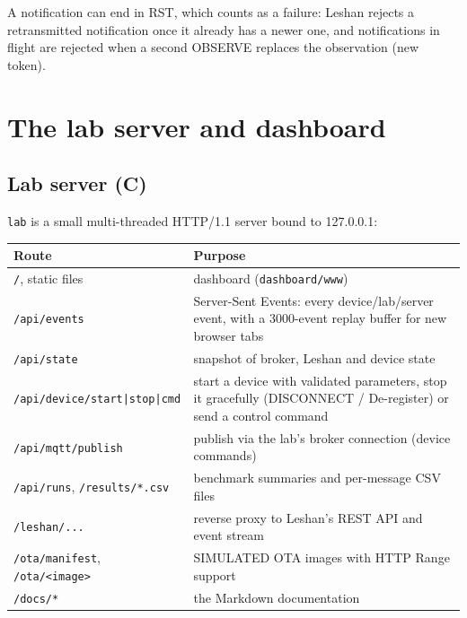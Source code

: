 \documentclass[11pt,a4paper]{article}
\newcommand{\code}[1]{\texttt{#1}}
\begin{document}
A notification can end in RST, which counts as a failure: Leshan rejects a
retransmitted notification once it already has a newer one, and notifications
in flight are rejected when a second OBSERVE replaces the observation (new
token).

\section{The lab server and dashboard}

\subsection{Lab server (C)}
\code{lab} is a small multi-threaded HTTP/1.1 server bound to 127.0.0.1:
\begin{longtable}{@{}p{4.5cm}p{10cm}@{}}
\toprule
Route & Purpose \\
\midrule
\endhead
\code{/}, static files & dashboard (\code{dashboard/www}) \\
\code{/api/events} & Server-Sent Events: every device/lab/server event, with a 3000-event replay buffer for new browser tabs \\
\code{/api/state} & snapshot of broker, Leshan and device state \\
\code{/api/device/start|stop|cmd} & start a device with validated parameters, stop it gracefully (DISCONNECT / De-register) or send a control command \\
\code{/api/mqtt/publish} & publish via the lab's broker connection (device commands) \\
\code{/api/runs}, \code{/results/*.csv} & benchmark summaries and per-message CSV files \\
\code{/leshan/...} & reverse proxy to Leshan's REST API and event stream \\
\code{/ota/manifest}, \code{/ota/<image>} & SIMULATED OTA images with HTTP Range support \\
\code{/docs/*} & the Markdown documentation \\
\bottomrule
\end{longtable}
\end{document}
